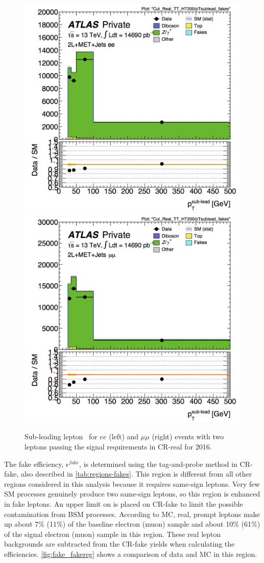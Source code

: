 \begin{centering}
\begin{figure}[bth]
\myfloatalign
\includegraphics[width=.45\linewidth]{figures/fakes/ee-Cut_Real_TT_HT200-pTsublead_fakes-lin_2016.png}
\includegraphics[width=.45\linewidth]{figures/fakes/mm-Cut_Real_TT_HT200-pTsublead_fakes-lin_2016.png}
\caption{Sub-leading lepton \pT\ for $ee$ (left) and $\mu\mu$ (right) events with two leptons passing the signal requirements in CR-real for 2016. }
\label{fig:fake_realreg}
\end{figure}
\end{centering}

The fake efficiency, $\epsilon^{fake}$, is determined using the tag-and-probe method in CR-fake, also described in \autoref{tab:regions-fakes}. This region is different from all other regions considered in this analysis because it requires same-sign leptons. Very few \ac{SM} processes genuinely produce two same-sign leptons, so this region is enhanced in fake leptons. An upper limit on \met is placed on CR-fake to limit the possible contamination from \ac{BSM} processes. According to \ac{MC}, real, prompt leptons make up about 7\% (11\%) of the baseline electron (muon) sample and about 10\% (61\%) of the signal electron (muon) sample in this region. These real lepton backgrounds are subtracted from the CR-fake yields when calculating the efficiencies. \autoref{fig:fake_fakereg} shows a comparison of data and \ac{MC} in this region.

